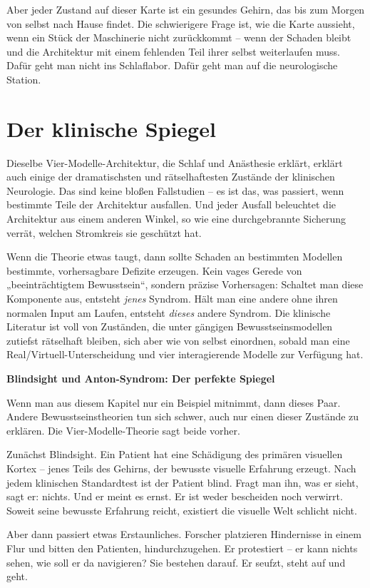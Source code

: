 \documentclass[11pt, twoside, openright]{book}
\begin{document}
Aber jeder Zustand auf dieser Karte ist ein gesundes Gehirn, das bis zum Morgen von selbst nach Hause findet. Die schwierigere Frage ist, wie die Karte aussieht, wenn ein Stück der Maschinerie nicht zurückkommt -- wenn der Schaden bleibt und die Architektur mit einem fehlenden Teil ihrer selbst weiterlaufen muss. Dafür geht man nicht ins Schlaflabor. Dafür geht man auf die neurologische Station.

\chapter{Der klinische Spiegel}

Dieselbe Vier-Modelle-Architektur, die Schlaf und Anästhesie erklärt, erklärt auch einige der dramatischsten und rätselhaftesten Zustände der klinischen Neurologie. Das sind keine bloßen Fallstudien -- es ist das, was passiert, wenn bestimmte Teile der Architektur ausfallen. Und jeder Ausfall beleuchtet die Architektur aus einem anderen Winkel, so wie eine durchgebrannte Sicherung verrät, welchen Stromkreis sie geschützt hat.

Wenn die Theorie etwas taugt, dann sollte Schaden an bestimmten Modellen bestimmte, vorhersagbare Defizite erzeugen. Kein vages Gerede von „beeinträchtigtem Bewusstsein“, sondern präzise Vorhersagen: Schaltet man diese Komponente aus, entsteht \textit{jenes} Syndrom. Hält man eine andere ohne ihren normalen Input am Laufen, entsteht \textit{dieses} andere Syndrom. Die klinische Literatur ist voll von Zuständen, die unter gängigen Bewusstseinsmodellen zutiefst rätselhaft bleiben, sich aber wie von selbst einordnen, sobald man eine Real/Virtuell-Unterscheidung und vier interagierende Modelle zur Verfügung hat.

\textbf{Blindsight und Anton-Syndrom: Der perfekte Spiegel}

Wenn man aus diesem Kapitel nur ein Beispiel mitnimmt, dann dieses Paar. Andere Bewusstseinstheorien tun sich schwer, auch nur einen dieser Zustände zu erklären. Die Vier-Modelle-Theorie sagt beide vorher.

Zunächst Blindsight. Ein Patient hat eine Schädigung des primären visuellen Kortex -- jenes Teils des Gehirns, der bewusste visuelle Erfahrung erzeugt. Nach jedem klinischen Standardtest ist der Patient blind. Fragt man ihn, was er sieht, sagt er: nichts. Und er meint es ernst. Er ist weder bescheiden noch verwirrt. Soweit seine bewusste Erfahrung reicht, existiert die visuelle Welt schlicht nicht.

Aber dann passiert etwas Erstaunliches. Forscher platzieren Hindernisse in einem Flur und bitten den Patienten, hindurchzugehen. Er protestiert -- er kann nichts sehen, wie soll er da navigieren? Sie bestehen darauf. Er seufzt, steht auf und geht.
\end{document}
